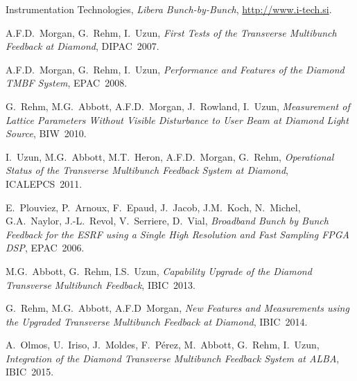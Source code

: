 \documentclass{jacow}
\begin{document}
\begin{thebibliography}{9}

Instrumentation Technologies, \emph{Libera Bunch-by-Bunch},
\url{http://www.i-tech.si}.

A.F.D.~Morgan, G.~Rehm, I.~Uzun, \emph{First Tests of the Transverse Multibunch
Feedback at Diamond}, DIPAC~2007.

A.F.D.~Morgan, G.~Rehm, I.~Uzun, \emph{Performance and Features of the Diamond
TMBF System}, EPAC~2008.

G.~Rehm, M.G.~Abbott, A.F.D.~Morgan, J.~Rowland, I.~Uzun, \emph{Measurement of
Lattice Parameters Without Visible Disturbance to User Beam at Diamond Light
Source}, BIW~2010.

I.~Uzun, M.G.~Abbott, M.T.~Heron, A.F.D.~Morgan, G.~Rehm, \emph{Operational
Status of the Transverse Multibunch Feedback System at Diamond}, ICALEPCS~2011.

E.~Plouviez, P.~Arnoux, F.~Epaud, J.~Jacob, J.M.~Koch, N.~Michel, G.A.~Naylor,
J.\mbox{-}L.~Revol, V.~Serriere, D.~Vial, \emph{Broadband Bunch by Bunch
Feedback for the ESRF using a Single High Resolution and Fast Sampling FPGA
DSP}, EPAC~2006.

M.G.~Abbott, G.~Rehm, I.S.~Uzun, \emph{Capability Upgrade of the Diamond
Transverse Multibunch Feedback}, IBIC~2013.

G.~Rehm, M.G.~Abbott, A.F.D~Morgan, \emph{New Features and Measurements using
the Upgraded Transverse Multibunch Feedback at Diamond}, IBIC~2014.

A.~Olmos, U.~Iriso, J.~Moldes, F.~P\'erez, M.~Abbott, G.~Rehm, I.~Uzun,
\emph{Integration of the Diamond Transverse Multibunch Feedback System at ALBA},
IBIC~2015.

\vspace{0pt}

\end{thebibliography}
\end{document}
